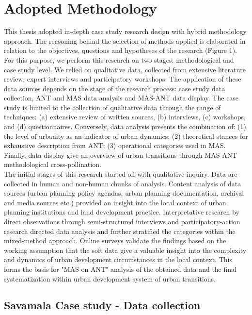 \documentclass[11pt]{report}
\begin{document}
\section{Adopted Methodology}

This thesis adopted in-depth case study research design with hybrid methodology approach. The reasoning behind the selection of methods applied is elaborated in relation to the objectives, questions and hypotheses of the research (Figure 1).  
\\
For this purpose, we perform this research on two stages: methodological and case study level. We relied on qualitative data, collected from extensive literature review, expert interviews and participatory workshops. The application of these data sources depends on the stage of the research process: case study data collection, ANT and MAS data analysis and MAS-ANT data display. The case study is limited to the collection of qualitative data through the range of techniques: (a) extensive review of written sources, (b) interviews, (c) workshops, and (d) questionnaires. Conversely, data analysis presents the combination of: (1) the level of urbanity as an indicator of urban dynamics; (2) theoretical stances for exhaustive description from ANT; (3) operational categories used in MAS. Finally, data display give an overview of urban transitions through MAS-ANT methodological cross-pollination. 
\\
The initial stages of this research started off with qualitative inquiry. Data are collected in human and non-human chunks of analysis. Content analysis of data sources (urban planning policy agendas, urban planning documentation, archival and media sources etc.) provided an insight into the local context of urban planning institutions and land development practice. Interpretative research by  direct observations through semi-structured interviews and participatory-action research directed data analysis and further stratified the categories within the mixed-method approach. Online surveys validate the findings based on the working assumption that the soft data give a valuable insight into the complexity and dynamics of urban development circumstances in the local context. This forms the basis for "MAS on ANT" analysis of the obtained data and the final systematization within urban development system of urban transitions.

\subsection{Savamala Case study - Data collection} \label{sec:predis}
\end{document}
